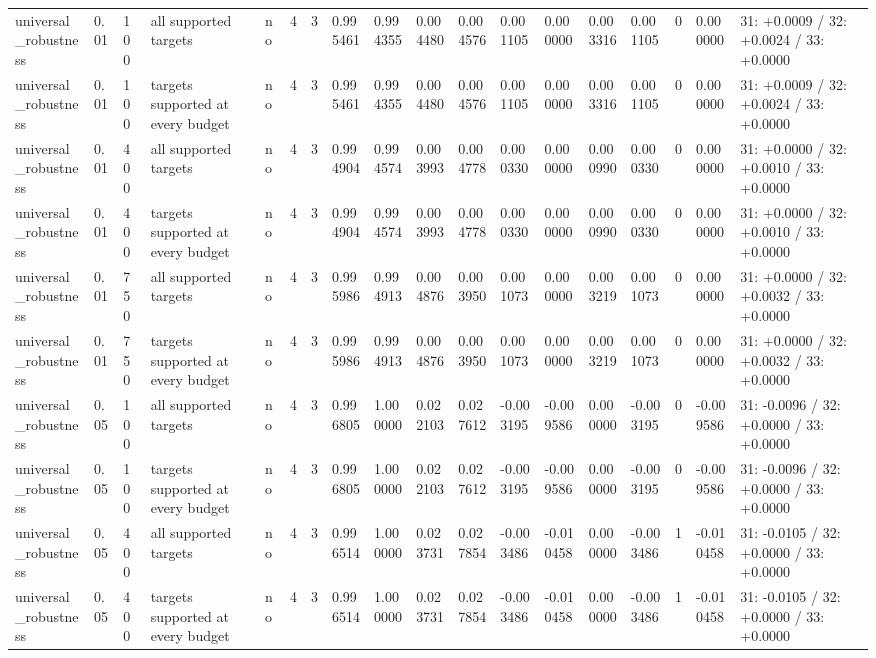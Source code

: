 \begin{tabular}{llllllllllllllllll}
universal\_robustness & 0.01 & 100 & all supported targets & no & 4 & 3 & 0.995461 & 0.994355 & 0.004480 & 0.004576 & 0.001105 & 0.000000 & 0.003316 & 0.001105 & 0 & 0.000000 & 31: +0.0009 / 32: +0.0024 / 33: +0.0000 \\
universal\_robustness & 0.01 & 100 & targets supported at every budget & no & 4 & 3 & 0.995461 & 0.994355 & 0.004480 & 0.004576 & 0.001105 & 0.000000 & 0.003316 & 0.001105 & 0 & 0.000000 & 31: +0.0009 / 32: +0.0024 / 33: +0.0000 \\
universal\_robustness & 0.01 & 400 & all supported targets & no & 4 & 3 & 0.994904 & 0.994574 & 0.003993 & 0.004778 & 0.000330 & 0.000000 & 0.000990 & 0.000330 & 0 & 0.000000 & 31: +0.0000 / 32: +0.0010 / 33: +0.0000 \\
universal\_robustness & 0.01 & 400 & targets supported at every budget & no & 4 & 3 & 0.994904 & 0.994574 & 0.003993 & 0.004778 & 0.000330 & 0.000000 & 0.000990 & 0.000330 & 0 & 0.000000 & 31: +0.0000 / 32: +0.0010 / 33: +0.0000 \\
universal\_robustness & 0.01 & 750 & all supported targets & no & 4 & 3 & 0.995986 & 0.994913 & 0.004876 & 0.003950 & 0.001073 & 0.000000 & 0.003219 & 0.001073 & 0 & 0.000000 & 31: +0.0000 / 32: +0.0032 / 33: +0.0000 \\
universal\_robustness & 0.01 & 750 & targets supported at every budget & no & 4 & 3 & 0.995986 & 0.994913 & 0.004876 & 0.003950 & 0.001073 & 0.000000 & 0.003219 & 0.001073 & 0 & 0.000000 & 31: +0.0000 / 32: +0.0032 / 33: +0.0000 \\
universal\_robustness & 0.05 & 100 & all supported targets & no & 4 & 3 & 0.996805 & 1.000000 & 0.022103 & 0.027612 & -0.003195 & -0.009586 & 0.000000 & -0.003195 & 0 & -0.009586 & 31: -0.0096 / 32: +0.0000 / 33: +0.0000 \\
universal\_robustness & 0.05 & 100 & targets supported at every budget & no & 4 & 3 & 0.996805 & 1.000000 & 0.022103 & 0.027612 & -0.003195 & -0.009586 & 0.000000 & -0.003195 & 0 & -0.009586 & 31: -0.0096 / 32: +0.0000 / 33: +0.0000 \\
universal\_robustness & 0.05 & 400 & all supported targets & no & 4 & 3 & 0.996514 & 1.000000 & 0.023731 & 0.027854 & -0.003486 & -0.010458 & 0.000000 & -0.003486 & 1 & -0.010458 & 31: -0.0105 / 32: +0.0000 / 33: +0.0000 \\
universal\_robustness & 0.05 & 400 & targets supported at every budget & no & 4 & 3 & 0.996514 & 1.000000 & 0.023731 & 0.027854 & -0.003486 & -0.010458 & 0.000000 & -0.003486 & 1 & -0.010458 & 31: -0.0105 / 32: +0.0000 / 33: +0.0000 \\

\end{tabular}
